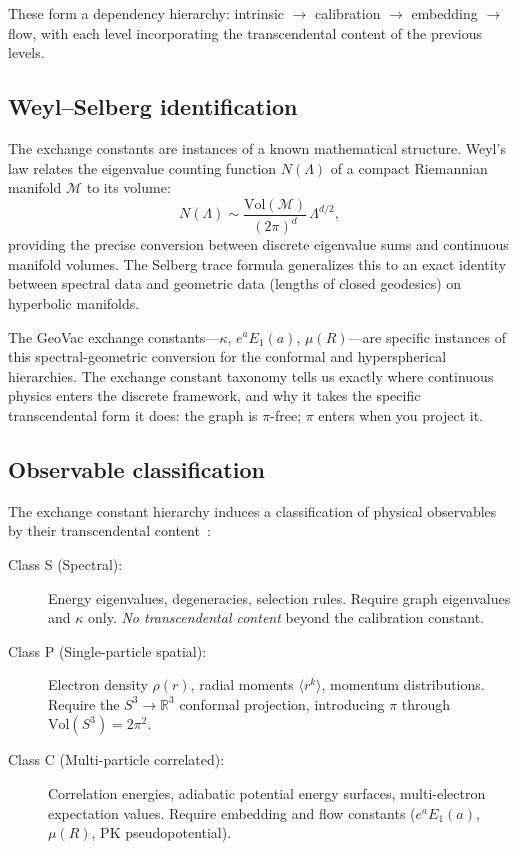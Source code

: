 \documentclass[aps,pra,twocolumn,superscriptaddress,longbibliography]{revtex4-2}
\begin{document}
\noindent These form a dependency hierarchy: intrinsic $\to$ calibration
$\to$ embedding $\to$ flow, with each level incorporating the
transcendental content of the previous levels.

\subsection{Weyl--Selberg identification}

The exchange constants are instances of a known mathematical
structure.  Weyl's law relates the eigenvalue counting function
$N(\Lambda)$ of a compact Riemannian manifold $\mathcal{M}$ to its
volume:
\begin{equation}
N(\Lambda) \sim \frac{\mathrm{Vol}(\mathcal{M})}{(2\pi)^d}\,
\Lambda^{d/2},
\label{eq:weyl}
\end{equation}
providing the precise conversion between discrete eigenvalue sums and
continuous manifold volumes.  The Selberg trace formula generalizes
this to an exact identity between spectral data and geometric data
(lengths of closed geodesics) on hyperbolic manifolds.

The GeoVac exchange constants---$\kappa$, $e^a E_1(a)$,
$\mu(R)$---are specific instances of this spectral-geometric
conversion for the conformal and hyperspherical hierarchies.  The
exchange constant taxonomy tells us exactly where continuous physics
enters the discrete framework, and why it takes the specific
transcendental form it does: the graph is $\pi$-free; $\pi$ enters
when you project it.

\subsection{Observable classification}

The exchange constant hierarchy induces a classification of physical
observables by their transcendental content~\cite{Paper18}:

\begin{description}
\item[Class S (Spectral):] Energy eigenvalues, degeneracies, selection
  rules.  Require graph eigenvalues and $\kappa$ only.  \textit{No
  transcendental content} beyond the calibration constant.

\item[Class P (Single-particle spatial):] Electron density $\rho(r)$,
  radial moments $\langle r^k \rangle$, momentum distributions.
  Require the $S^3 \to \mathbb{R}^3$ conformal projection, introducing
  $\pi$ through $\mathrm{Vol}(S^3) = 2\pi^2$.

\item[Class C (Multi-particle correlated):] Correlation energies,
  adiabatic potential energy surfaces, multi-electron expectation
  values.  Require embedding and flow constants ($e^a E_1(a)$,
  $\mu(R)$, PK pseudopotential).
\end{description}
\end{document}
